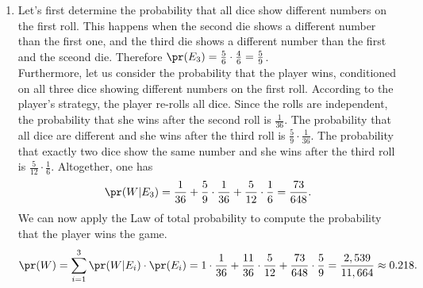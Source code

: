 \begin{enumerate}
  \item[(d)] Let's first determine the probability that all dice show different
    numbers on the first roll. This happens when the second die shows a different
    number than the first one, and the third die shows a different number than the
    first and the sceond die. Therefore $\pr(E_3) = \frac{5}{6} \cdot \frac{4}{6}
    = \frac{5}{9}$. \\
    Furthermore, let us consider the probability that the player wins, conditioned
    on all three dice showing different numbers on the first roll. According to the
    player's strategy, the player re-rolls all dice. Since the rolls are independent,
    the probability that she wins after the second roll is $\frac{1}{36}$. The
    probability that all dice are different and she wins after the third roll is
    $\frac{5}{9} \cdot \frac{1}{36}$. The probability that exactly two dice show the
    same number and she wins after the third roll is $\frac{5}{12} \cdot \frac{1}{6}$.  Altogether, one has
    \[ \pr(W|E_3)
        = \frac{1}{36} + \frac{5}{9} \cdot \frac{1}{36} +
          \frac{5}{12} \cdot \frac{1}{6}
        = \frac{73}{648}.
    \]
    We can now apply the Law of total probability to compute the probability that
    the player wins the game.
    \[
      \pr(W)
        = \sum_{i=1}^3 \pr(W|E_i) \cdot \pr(E_i)
        = 1 \cdot \frac{1}{36} + \frac{11}{36} \cdot \frac{5}{12} + \frac{73}{648} \cdot \frac{5}{9}
        = \frac{2,539}{11,664}
        \approx 0.218.
    \]
\end{enumerate}


